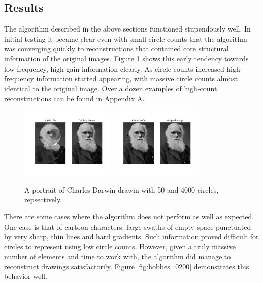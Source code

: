 \documentclass[12pt]{article}
\begin{document}
\subsection{Results}
The algorithm described in the above sections functioned stupendously well. In initial testing it became clear even with small circle counts that the algorithm was converging quickly to reconstructions that contained core structural information of the original images. Figure \ref{fig:darwin_0050} shows this early tendency towards low-frequency, high-gain information clearly. As circle counts increased high-frequency information started appearing, with massive circle counts almost identical to the original image. Over a dozen examples of high-count reconstructions can be found in Appendix A. 
\begin{figure}[H]
\centering
\noindent\includegraphics[width=0.4\textwidth]{../results/darwin/darwin_0050}
\noindent\includegraphics[width=0.4\textwidth]{../results/darwin/darwin_4000}
\caption{A portrait of Charles Darwin drawin with 50 and 4000 circles, repsectively. }
\label{fig:darwin_0050}
\end{figure}
There are some cases where the algorithm does not perform as well as expected. One case is that of cartoon characters: large swaths of empty space punctuated by very sharp, thin lines and hard gradients. Such information proved difficult for circles to represent using low circle counts. However, given a truly massive number of elements and time to work with, the algorithm did manage to reconstruct drawings satisfactorily. Figure \ref{fig:hobbes_0200} demonstrates this behavior well. 
\end{document}
